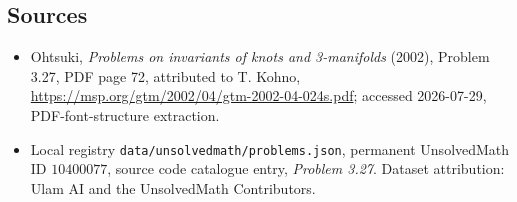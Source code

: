 \documentclass[11pt]{article}
\begin{document}
\subsection{Sources}
\begin{itemize}
\item Ohtsuki, \emph{Problems on invariants of knots and 3-manifolds} (2002), Problem 3.27, PDF page 72, attributed to T. Kohno, \url{https://msp.org/gtm/2002/04/gtm-2002-04-024s.pdf}; accessed 2026-07-29, PDF-font-structure extraction.
\item Local registry \texttt{data/unsolvedmath/problems.json}, permanent UnsolvedMath ID $10400077$, source code catalogue entry, \emph{Problem 3.27}. Dataset attribution: Ulam AI and the UnsolvedMath Contributors.
\end{itemize}
\end{document}
